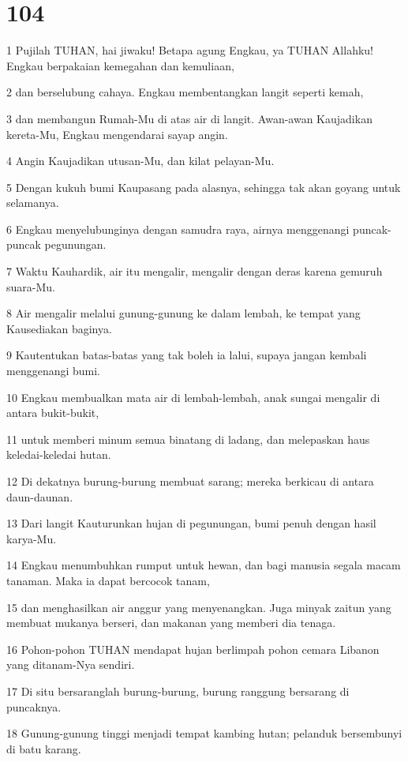 \chapter{104}

\par 1 Pujilah TUHAN, hai jiwaku! Betapa agung Engkau, ya TUHAN Allahku! Engkau berpakaian kemegahan dan kemuliaan,
\par 2 dan berselubung cahaya. Engkau membentangkan langit seperti kemah,
\par 3 dan membangun Rumah-Mu di atas air di langit. Awan-awan Kaujadikan kereta-Mu, Engkau mengendarai sayap angin.
\par 4 Angin Kaujadikan utusan-Mu, dan kilat pelayan-Mu.
\par 5 Dengan kukuh bumi Kaupasang pada alasnya, sehingga tak akan goyang untuk selamanya.
\par 6 Engkau menyelubunginya dengan samudra raya, airnya menggenangi puncak-puncak pegunungan.
\par 7 Waktu Kauhardik, air itu mengalir, mengalir dengan deras karena gemuruh suara-Mu.
\par 8 Air mengalir melalui gunung-gunung ke dalam lembah, ke tempat yang Kausediakan baginya.
\par 9 Kautentukan batas-batas yang tak boleh ia lalui, supaya jangan kembali menggenangi bumi.
\par 10 Engkau membualkan mata air di lembah-lembah, anak sungai mengalir di antara bukit-bukit,
\par 11 untuk memberi minum semua binatang di ladang, dan melepaskan haus keledai-keledai hutan.
\par 12 Di dekatnya burung-burung membuat sarang; mereka berkicau di antara daun-daunan.
\par 13 Dari langit Kauturunkan hujan di pegunungan, bumi penuh dengan hasil karya-Mu.
\par 14 Engkau menumbuhkan rumput untuk hewan, dan bagi manusia segala macam tanaman. Maka ia dapat bercocok tanam,
\par 15 dan menghasilkan air anggur yang menyenangkan. Juga minyak zaitun yang membuat mukanya berseri, dan makanan yang memberi dia tenaga.
\par 16 Pohon-pohon TUHAN mendapat hujan berlimpah pohon cemara Libanon yang ditanam-Nya sendiri.
\par 17 Di situ bersaranglah burung-burung, burung ranggung bersarang di puncaknya.
\par 18 Gunung-gunung tinggi menjadi tempat kambing hutan; pelanduk bersembunyi di batu karang.
